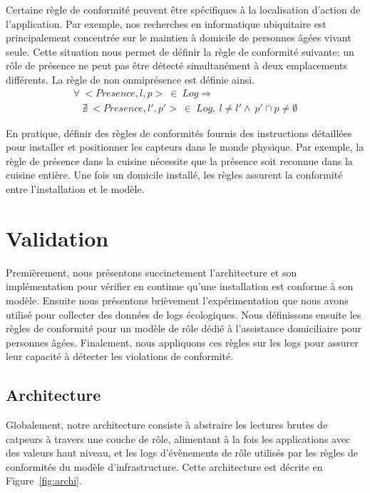 Certaine règle de conformité peuvent être spécifiques à la localisation d'action de l'application. Par exemple, nos recherches en informatique ubiquitaire est principalement concentrée sur le maintien à domicile de personnes âgées vivant seule. Cette situation nous permet de définir la règle de conformité suivante: un rôle de présence ne peut pas être détecté simultanément à deux emplacements différents. La règle de non onmiprésence est définie ainsi. 
\begin{displaymath}\label{archi:algebra:example3}
  \begin{array}{c}
    \forall~<Presence, l, p>~\in~Log \Rightarrow \\
     ~~~~\nexists~ <Presence, l', p'>~\in~Log,~l \neq l' \wedge ~p' \cap p \neq \emptyset
  \end{array}
\end{displaymath}

En pratique, définir des règles de conformités fournis des instructions détaillées pour installer et positionner les capteurs dans le monde physique. Par exemple, la règle de présence dans la cuisine nécessite que la présence soit reconnue dans la cuisine entière. Une fois un domicile installé, les règles assurent la conformité entre l'installation et le modèle.
\section{Validation}



Premièrement, nous présentons succinctement l'architecture et son implémentation pour vérifier en continue qu'une installation est conforme à son modèle. Ensuite nous présentons brièvement l'expérimentation que nous avons utilisé pour collecter des données de logs écologiques. Nous définissons ensuite les règles de conformité pour un modèle de rôle dédié à l'assistance domiciliaire pour personnes âgées. Finalement, nous appliquons ces règles sur les logs pour assurer leur capacité à détecter les violations de conformité.

\subsection{Architecture}
Globalement, notre architecture consiste à abstraire les lectures brutes de catpeurs à travers une couche de rôle, alimentant à la fois les applications avec des valeurs haut niveau, et les logs d'évènements de rôle utilisés par les règles de conformités du modèle d'infrastructure. Cette architecture est décrite en Figure~\ref{fig:archi}.

